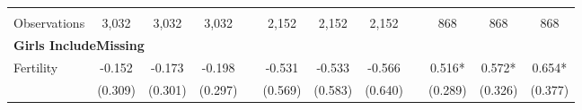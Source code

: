 \begin{landscape}
\begin{table}[htpb!]
\begin{center}
\begin{tabular}{lcccp{2mm}cccp{2mm}ccc}
\begin{footnotesize}\end{footnotesize}&\begin{footnotesize}\end{footnotesize}&\begin{footnotesize}\end{footnotesize}&\begin{footnotesize}\end{footnotesize}&\begin{footnotesize}\end{footnotesize}&\begin{footnotesize}\end{footnotesize}&\begin{footnotesize}\end{footnotesize}&\begin{footnotesize}\end{footnotesize}&\begin{footnotesize}\end{footnotesize}&\begin{footnotesize}\end{footnotesize}&\begin{footnotesize}\end{footnotesize}&\begin{footnotesize}\end{footnotesize}\\Observations&3,032&3,032&3,032&&2,152&2,152&2,152&&868&868&868\\
\multicolumn{12}{l}{\textbf{Girls IncludeMissing}}\\ 
Fertility&-0.152&-0.173&-0.198&&-0.531&-0.533&-0.566&&0.516*&0.572*&0.654*\\
&(0.309)&(0.301)&(0.297)&&(0.569)&(0.583)&(0.640)&&(0.289)&(0.326)&(0.377)\\

\end{tabular}
\end{center}
\end{table}
\end{landscape}
